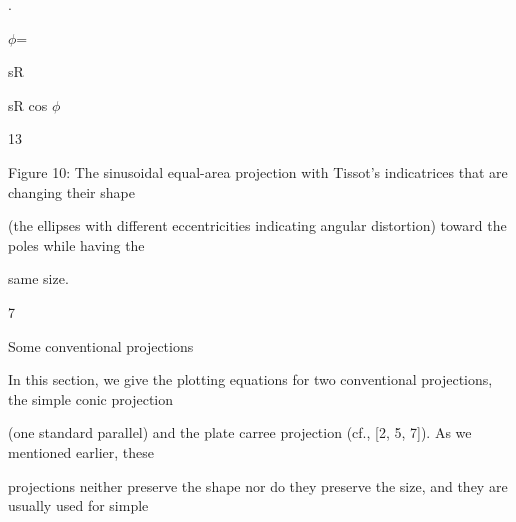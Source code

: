 \documentclass[a4paper,portrait,12pt]{article}
\begin{document}
.


\begin{flushleft}
$\phi$=
\end{flushleft}


\begin{flushleft}
sR
\end{flushleft}


\begin{flushleft}
sR cos $\phi$
\end{flushleft}


13





\begin{flushleft}
\newpage
Figure 10: The sinusoidal equal-area projection with Tissot's indicatrices that are changing their shape
\end{flushleft}


\begin{flushleft}
(the ellipses with different eccentricities indicating angular distortion) toward the poles while having the
\end{flushleft}


\begin{flushleft}
same size.
\end{flushleft}





7





\begin{flushleft}
Some conventional projections
\end{flushleft}





\begin{flushleft}
In this section, we give the plotting equations for two conventional projections, the simple conic projection
\end{flushleft}


\begin{flushleft}
(one standard parallel) and the plate carree projection (cf., [2, 5, 7]). As we mentioned earlier, these
\end{flushleft}


\begin{flushleft}
projections neither preserve the shape nor do they preserve the size, and they are usually used for simple
\end{flushleft}
\end{document}
